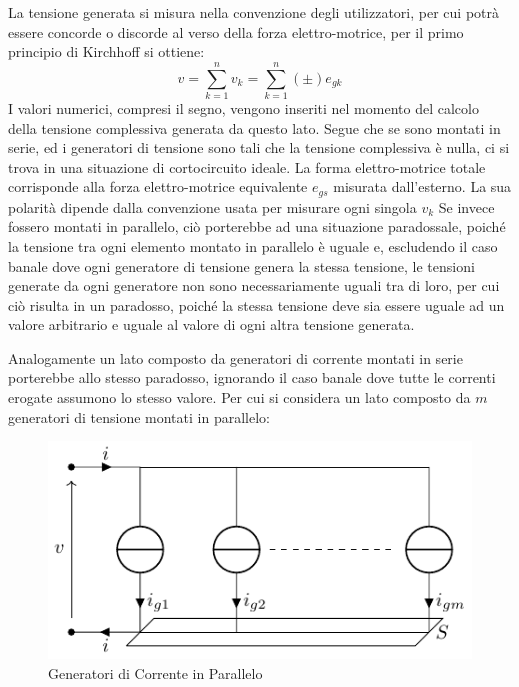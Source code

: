 \documentclass{article}
\numberwithin{equation}{subsection}
\begin{document}
La tensione generata si misura nella convenzione degli utilizzatori, per cui potrà essere concorde o discorde al verso della forza elettro-motrice, per il 
primo principio di Kirchhoff si ottiene:
\begin{equation*}
    v=\displaystyle\sum_{k=1}^nv_k=\sum_{k=1}^n(\pm)e_{gk}
\end{equation*}
I valori numerici, compresi il segno, vengono inseriti nel momento del calcolo della tensione complessiva generata da questo lato. Segue che se sono montati in serie, 
ed i generatori di tensione sono tali che la tensione complessiva è nulla, ci si trova in una situazione di cortocircuito ideale. La forma elettro-motrice totale 
corrisponde alla forza elettro-motrice equivalente $e_{gs}$ misurata dall'esterno. La sua polarità dipende dalla convenzione usata per misurare ogni singola $v_k$
Se invece fossero montati in parallelo, ciò porterebbe ad una situazione paradossale, poiché la tensione tra ogni elemento montato in parallelo è uguale e, escludendo il caso 
banale dove ogni generatore di tensione genera la stessa tensione, le tensioni generate da ogni generatore non sono necessariamente uguali tra di loro, per cui ciò risulta 
in un paradosso, poiché la stessa tensione deve sia essere uguale ad un valore arbitrario e uguale al valore di ogni altra tensione generata. 



Analogamente un lato composto da generatori di corrente montati in serie porterebbe allo stesso paradosso, ignorando il caso banale dove tutte le correnti erogate assumono 
lo stesso valore. Per cui si considera un lato composto da $m$ generatori di tensione montati in parallelo:

\begin{figure}[H]%
    \centering
    \includegraphics{generatore-corrente-parallelo.pdf}%
    \caption{Generatori di Corrente in Parallelo}%
    \label{fig:generatore-corrente-parallelo}
\end{figure}
\end{document}
